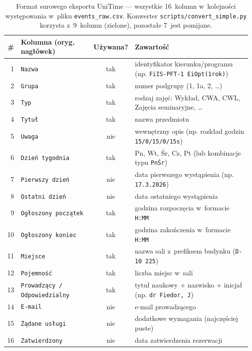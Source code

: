 \documentclass{common/sprawozdanie-agh}
\begin{document}
\begin{table}[H]
\centering\small
\begin{tabularx}{\textwidth}{rlcX}
\toprule
\textbf{\#} & \textbf{Kolumna (oryg. nagłówek)} & \textbf{Używana?} & \textbf{Zawartość} \\
\midrule
 1 & \texttt{Nazwa}                       & \cellcolor{obsGreenBg}tak & identyfikator kierunku/programu (np. \texttt{FiIS-PFT-1 EiOpt(1rok)}) \\
 2 & \texttt{Grupa}                       & \cellcolor{obsGreenBg}tak & numer podgrupy (1, 1a, 2, \ldots) \\
 3 & \texttt{Typ}                         & \cellcolor{obsGreenBg}tak & rodzaj zajęć: Wykład, CWA, CWL, Zajęcia seminaryjne, \ldots \\
 4 & \texttt{Tytuł}                       & \cellcolor{obsGreenBg}tak & nazwa przedmiotu \\
 5 & \texttt{Uwaga}                       & \cellcolor{obsRedBg}nie    & wewnętrzny opis (np. rozkład godzin \texttt{15/0/15/0/15s}) \\
 6 & \texttt{Dzień tygodnia}              & \cellcolor{obsGreenBg}tak & Pn, Wt, Śr, Cz, Pt (lub kombinacje typu \texttt{PnŚr}) \\
 7 & \texttt{Pierwszy dzień}              & \cellcolor{obsRedBg}nie    & data pierwszego wystąpienia (np. \texttt{17.3.2026}) \\
 8 & \texttt{Ostatni dzień}               & \cellcolor{obsRedBg}nie    & data ostatniego wystąpienia \\
 9 & \texttt{Ogłoszony początek}          & \cellcolor{obsGreenBg}tak & godzina rozpoczęcia w~formacie \texttt{H:MM} \\
10 & \texttt{Ogłoszony koniec}            & \cellcolor{obsGreenBg}tak & godzina zakończenia w~formacie \texttt{H:MM} \\
11 & \texttt{Miejsce}                     & \cellcolor{obsGreenBg}tak & nazwa sali z~prefiksem budynku (\texttt{D-10 225}) \\
12 & \texttt{Pojemność}                   & \cellcolor{obsGreenBg}tak & liczba miejsc w~sali \\
13 & \texttt{Prowadzący / Odpowiedzialny} & \cellcolor{obsGreenBg}tak & tytuł naukowy + nazwisko + inicjał (np. \texttt{dr Fiedor, J}) \\
14 & \texttt{E-mail}                      & \cellcolor{obsRedBg}nie    & e-mail prowadzącego \\
15 & \texttt{Żądane usługi}               & \cellcolor{obsRedBg}nie    & dodatkowe wymagania (najczęściej puste) \\
16 & \texttt{Zatwierdzony}                & \cellcolor{obsRedBg}nie    & data zatwierdzenia rezerwacji \\
\bottomrule
\end{tabularx}
\caption{Format surowego eksportu UniTime --- wszystkie 16~kolumn w~kolejności występowania w~pliku \texttt{events\_raw.csv}. Konwerter \texttt{scripts/convert\_simple.py} korzysta z~9~kolumn (zielone), pozostałe 7~jest pomijane.}
\end{table}
\end{document}
